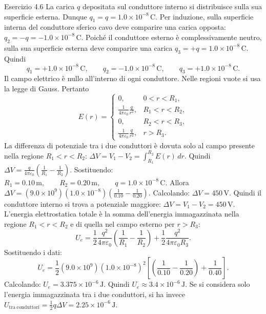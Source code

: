 \documentclass[a4paper]{article}
\begin{document}
\begin{snippetsolution}{Esercizio 4.6}
    La carica \(q\) depositata sul conduttore interno si distribuisce sulla sua
    superficie esterna. Dunque
    \(q_1 = q = 1.0 \times 10^{-8}\,\mathrm{C}.\)
    Per induzione, sulla superficie interna del conduttore sferico cavo deve
    comparire una carica opposta:
    \(q_2 = -q = -1.0 \times 10^{-8}\,\mathrm{C}.\)
    Poiché il conduttore esterno è complessivamente neutro, sulla sua superficie
    esterna deve comparire una carica
    \(q_3 = +q = 1.0 \times 10^{-8}\,\mathrm{C}.\)
    Quindi
    \[
        \boxed{q_1 = +1.0 \times 10^{-8}\,\mathrm{C}},
        \qquad
        \boxed{q_2 = -1.0 \times 10^{-8}\,\mathrm{C}},
        \qquad
        \boxed{q_3 = +1.0 \times 10^{-8}\,\mathrm{C}}.
    \]
    Il campo elettrico è nullo all'interno di ogni conduttore. Nelle regioni
    vuote si usa la legge di Gauss.
    Pertanto
    \[
        E(r) =
        \begin{cases}
            0,
            & 0 < r < R_1, \\[4pt]
            \displaystyle
            \frac{1}{4\pi\varepsilon_0}\frac{q}{r^2},
            & R_1 < r < R_2, \\[10pt]
            0,
            & R_2 < r < R_3, \\[4pt]
            \displaystyle
            \frac{1}{4\pi\varepsilon_0}\frac{q}{r^2},
            & r > R_3.
        \end{cases}
    \]
    La differenza di potenziale tra i due conduttori è dovuta solo al campo
    presente nella regione \(R_1 < r < R_2\):
    \(\Delta V = V_1 - V_2 = \int_{R_1}^{R_2} E(r)\,dr.\)
    Quindi
    \(\Delta V = \frac{q}{4\pi\varepsilon_0} \left( \frac{1}{R_1} - \frac{1}{R_2} \right).\)
    Sostituendo:
    \(R_1 = 0.10\,\mathrm{m}, \qquad R_2 = 0.20\,\mathrm{m}, \qquad q = 1.0 \times 10^{-8}\,\mathrm{C}.\)
    Allora
    \(\Delta V = \left(9.0 \times 10^9\right) \left(1.0 \times 10^{-8}\right) \left( \frac{1}{0.10} - \frac{1}{0.20} \right).\)
    Calcolando:
    \(\Delta V = 450\,\mathrm{V}.\)
    Quindi il conduttore interno si trova a potenziale maggiore:
    \(\boxed{\Delta V = V_1 - V_2 = 450\,\mathrm{V}}.\)
    L'energia elettrostatica totale è la somma dell'energia immagazzinata nella
    regione \(R_1 < r < R_2\) e di quella nel campo esterno per \(r > R_3\):
    \[
        U_e =
        \frac{1}{2}
        \frac{q^2}{4\pi\varepsilon_0}
        \left(
            \frac{1}{R_1}
            -
            \frac{1}{R_2}
        \right)
        +
        \frac{1}{2}
        \frac{q^2}{4\pi\varepsilon_0 R_3}.
    \]
    Sostituendo i dati:
    \[
        U_e =
        \frac{1}{2}
        \left(9.0 \times 10^9\right)
        \left(1.0 \times 10^{-8}\right)^2
        \left[
            \left(
                \frac{1}{0.10}
                -
                \frac{1}{0.20}
            \right)
            +
            \frac{1}{0.40}
        \right].
    \]
    Calcolando:
    \(U_e = 3.375 \times 10^{-6}\,\mathrm{J}.\)
    Quindi
    \(\boxed{U_e \approx 3.4 \times 10^{-6}\,\mathrm{J}}.\)
    Se si considera solo l'energia immagazzinata tra i due conduttori, si ha
    invece
    \(U_{\mathrm{tra\ conduttori}} = \frac{1}{2}q\Delta V = 2.25 \times 10^{-6}\,\mathrm{J}.\)
\end{snippetsolution}
\end{document}
